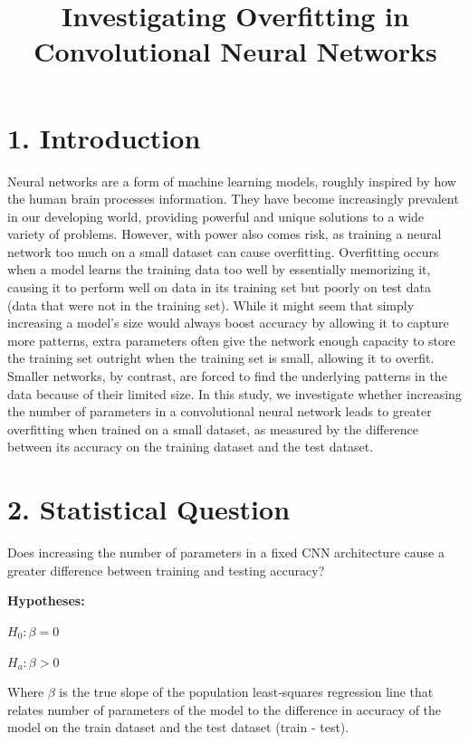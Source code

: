 \documentclass[12pt]{article}
\title{Investigating Overfitting in Convolutional Neural Networks}\date{}
\begin{document}
    \maketitle

    \section*{1. Introduction}

    Neural networks are a form of machine learning models, roughly inspired by how the human brain
    processes information. They have become increasingly prevalent in our developing world, providing
    powerful and unique solutions to a wide variety of problems. However, with power also comes risk,
    as training a neural network too much on a small dataset can cause overfitting. Overfitting occurs
    when a model learns the training data too well by essentially memorizing it, causing it to perform
    well on data in its training set but poorly on test data (data that were not in the training set).
    While it might seem that simply increasing a model’s size would always boost accuracy by allowing it to
    capture more patterns, extra parameters often give the network enough capacity to store the training set
    outright when the training set is small, allowing it to overfit. Smaller networks, by contrast, are forced to find the underlying patterns
    in the data because of their limited size. In this study, we investigate whether increasing the number of
    parameters in a convolutional neural network leads to greater overfitting when trained on a small dataset, as
    measured by the difference between its accuracy on the training dataset and the test dataset.

    \section*{2. Statistical Question}

    Does increasing the number of parameters in a fixed CNN architecture cause a greater difference
    between training and testing accuracy?

    \noindent\textbf{Hypotheses:}\newline
    \centerline{$H_0: \beta = 0$} \newline
    \centerline{$H_a: \beta > 0$} \newline
    Where $\beta$ is the true slope of the population least‐squares regression line that relates number
    of parameters of the model to the difference in accuracy of the model on the train dataset and the
    test dataset (train - test).
\end{document}
